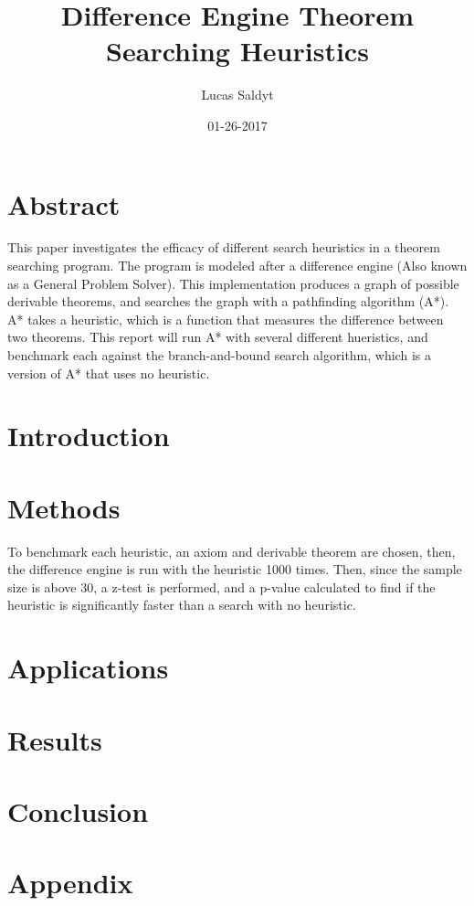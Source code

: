 \documentclass{article}
\title{Difference Engine Theorem Searching Heuristics}
\date{01-26-2017}
\author{Lucas Saldyt}
\begin{document}
\maketitle
{}
\newpage
{}

\section{Abstract}

    This paper investigates the efficacy of different search heuristics in a theorem searching program. 
The program is modeled after a difference engine (Also known as a General Problem Solver).
This implementation produces a graph of possible derivable theorems, and searches the graph with a pathfinding algorithm (A*). 
A* takes a heuristic, which is a function that measures the difference between two theorems.
This report will run A* with several different hueristics, and benchmark each against the branch-and-bound search algorithm, which is a version of A* that uses no heuristic. 

\section{Introduction}



\section{Methods}

To benchmark each heuristic, an axiom and derivable theorem are chosen, then, the difference engine is run with the heuristic 1000 times. 
Then, since the sample size is above 30, a z-test is performed, and a p-value calculated to find if the heuristic is significantly faster than a search with no heuristic.
\section{Applications}
\section{Results}
\section{Conclusion}
\section{Appendix}
\end{document}
